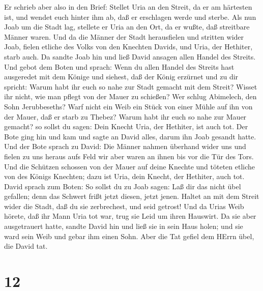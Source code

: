  Er schrieb aber also in den Brief: Stellet Uria an den
Streit, da er am härtesten ist, und wendet euch hinter ihm ab, daß er
erschlagen werde und sterbe.  Als nun Joab um die Stadt
lag, stellete er Uria an den Ort, da er wußte, daß streitbare Männer
waren.  Und da die Männer der Stadt herausfielen und
stritten wider Joab, fielen etliche des Volks von den Knechten Davids,
und Uria, der Hethiter, starb auch.  Da sandte Joab hin und
ließ David ansagen allen Handel des Streits.  Und gebot dem
Boten und sprach: Wenn du allen Handel des Streits hast ausgeredet mit
dem Könige  und siehest, daß der König erzürnet und zu dir
spricht: Warum habt ihr euch so nahe zur Stadt gemacht mit dem Streit?
Wisset ihr nicht, wie man pflegt von der Mauer zu schießen?
 Wer schlug Abimelech, den Sohn Jerubbeseths? Warf nicht
ein Weib ein Stück von einer Mühle auf ihn von der Mauer, daß er starb
zu Thebez? Warum habt ihr euch so nahe zur Mauer gemacht? so sollst du
sagen: Dein Knecht Uria, der Hethiter, ist auch tot.  Der
Bote ging hin und kam und sagte an David alles, darum ihn Joab gesandt
hatte.  Und der Bote sprach zu David: Die Männer nahmen
überhand wider uns und fielen zu uns heraus aufs Feld wir aber waren an
ihnen bis vor die Tür des Tors.  Und die Schützen schossen
von der Mauer auf deine Knechte und töteten etliche von des Königs
Knechten; dazu ist Uria, dein Knecht, der Hethiter, auch tot.
 David sprach zum Boten: So sollst du zu Joab sagen: Laß
dir das nicht übel gefallen; denn das Schwert frißt jetzt diesen, jetzt
jenen. Haltet an mit dem Streit wider die Stadt, daß du sie zerbrechest,
und seid getrost!  Und da Urias Weib hörete, daß ihr Mann
Uria tot war, trug sie Leid um ihren Hauswirt.  Da sie aber
ausgetrauert hatte, sandte David hin und ließ sie in sein Haus holen;
und sie ward sein Weib und gebar ihm einen Sohn. Aber die Tat gefiel dem
HErrn übel, die David tat.

\hypertarget{section-11}{%
\section{12}\label{section-11}}

